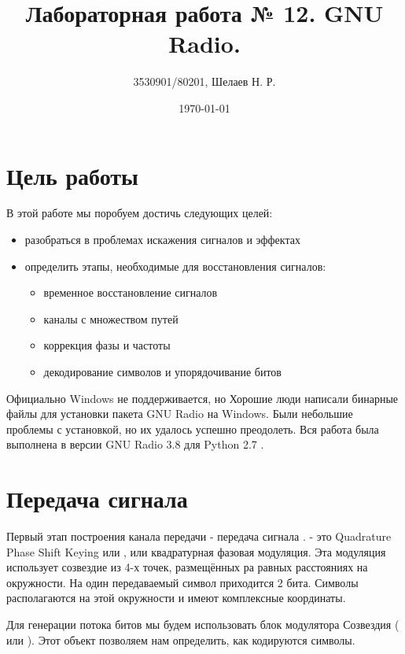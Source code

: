 \documentclass[a4paper, 12pt]{report}
\author{3530901/80201, Шелаев Н. Р.}
\title{Лабораторная работа № 12. GNU Radio.}
\date{\today}
\begin{document}
	\maketitle
	\tableofcontents
	\listoffigures

	\chapter{Цель работы}
	В этой работе мы поробуем достичь следующих целей:
	\begin{itemize}
        		\item разобраться в  проблемах искажения сигналов и  эффектах
        		\item определить этапы, необходимые для восстановления сигналов:
        		\begin{itemize}
            		\item временное восстановление сигналов
           		\item каналы с множеством путей
           		\item коррекция фазы и частоты
            		\item декодирование символов и упорядочивание битов
        		\end{itemize}
    	\end{itemize}
	
	Официально Windows не поддерживается, но Хорошие люди написали бинарные файлы для установки пакета GNU Radio на Windows. Были небольшие проблемы с установкой, но их удалось успешно преодолеть.
Вся работа была выполнена в версии GNU Radio 3.8 для Python 2.7 .
	
	\chapter{Передача сигнала}
	Первый этап построения канала передачи - передача сигнала . - это Quadrature Phase Shift Keying или , или квадратурная фазовая модуляция. Эта модуляция использует созвездие из 4-х точек, размещённых ра равных расстояниях на окружности. На один передаваемый символ приходится 2 бита. Символы располагаются на этой окружности и имеют комплексные координаты. 
	
	Для генерации потока битов мы будем использовать блок модулятора Созвездия ( или ). Этот объект позволяем нам определить, как кодируются символы. 
\end{document}
